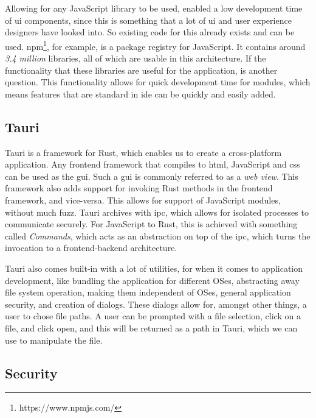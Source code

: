 Allowing for any JavaScript library to be used, enabled a low development time
of \gls*{ui} components, since this is something that a lot of \gls*{ui} and user
experience designers have looked into. So existing code for this already exists
and can be used. \gls*{npm}\footnote{https://www.npmjs.com/}, for example, is a
package registry for JavaScript. It contains around \textit{3.4 million}
libraries, all of which are usable in this architecture. If the functionality
that these libraries are useful for the application, is another question. This
functionality allows for quick development time for modules, which means
features that are standard in \gls*{ide} can be quickly and easily added.

\subsection{Tauri}

Tauri is a framework for Rust, which enables us to create a cross-platform
application. Any frontend framework that compiles to \gls*{html}, JavaScript and
\gls*{css} can be used as the \gls*{gui}. Such a \gls*{gui} is commonly referred to
as a \textit{web view}. This framework also adds support for invoking Rust
methods in the frontend framework, and vice-versa. This allows for support of
JavaScript modules, without much fuzz. Tauri archives with \gls*{ipc}, which
allows for isolated processes to communicate securely. For JavaScript to Rust,
this is achieved with something called \textit{Commands}, which acts as an
abstraction on top of the \gls*{ipc}, which turns the invocation to a
frontend-backend architecture.

Tauri also comes built-in with a lot of utilities, for when it comes to
application development, like bundling the application for different OSes,
abstracting away file system operation, making them independent of OSes, general
application security, and creation of dialogs. These dialogs allow for, amongst
other things, a user to chose file paths. A user can be prompted with a file
selection, click on a file, and click open, and this will be returned as a path
in Tauri, which we can use to manipulate the file.


\subsection{Security}

